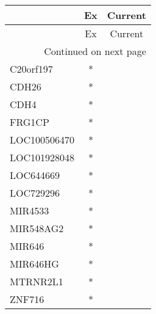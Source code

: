 \begin{longtable}{lcc}
\toprule
{} & Ex & Current \\
\midrule
\endfirsthead

\toprule
{} & Ex & Current \\
\midrule
\endhead
\midrule
\multicolumn{3}{r}{{Continued on next page}} \\
\midrule
\endfoot

\bottomrule
\endlastfoot
C20orf197    &  * &         \\
CDH26        &  * &         \\
CDH4         &  * &         \\
FRG1CP       &  * &         \\
LOC100506470 &  * &         \\
LOC101928048 &  * &         \\
LOC644669    &  * &         \\
LOC729296    &  * &         \\
MIR4533      &  * &         \\
MIR548AG2    &  * &         \\
MIR646       &  * &         \\
MIR646HG     &  * &         \\
MTRNR2L1     &  * &         \\
ZNF716       &  * &         \\
\end{longtable}
